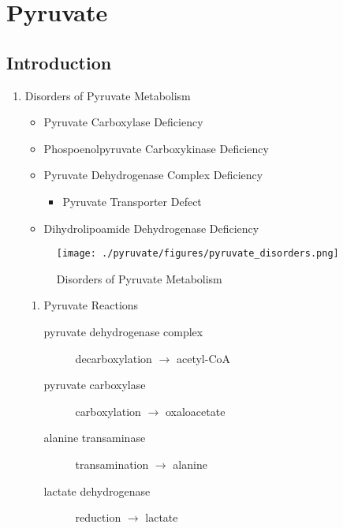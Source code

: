 \documentclass{scrartcl}
\begin{document}
\section{Pyruvate}
\label{sec:org5563591}
\subsection{Introduction}
\label{sec:orgb89a009}
\begin{enumerate}
\item Disorders of Pyruvate Metabolism
\label{sec:orgebe24ae}

\begin{itemize}
\item Pyruvate Carboxylase Deficiency
\item Phospoenolpyruvate Carboxykinase Deficiency
\item Pyruvate Dehydrogenase Complex Deficiency
\begin{itemize}
\item Pyruvate Transporter Defect
\end{itemize}
\item Dihydrolipoamide Dehydrogenase Deficiency
\end{itemize}


\begin{figure}[htbp]
\centering
\texttt{[image: ./pyruvate/figures/pyruvate\_disorders.png]}
\caption[TCA]{\label{fig:org30f584c}
Disorders of Pyruvate Metabolism}
\end{figure}

\begin{enumerate}
\item Pyruvate Reactions
\label{sec:org2fab598}

\begin{description}
\item[{pyruvate dehydrogenase complex}] decarboxylation \(\to\) acetyl-CoA
\end{description}


\begin{description}
\item[{pyruvate carboxylase}] carboxylation \(\to\) oxaloacetate
\end{description}


\begin{description}
\item[{alanine transaminase}] transamination \(\to\) alanine
\end{description}


\begin{description}
\item[{lactate dehydrogenase}] reduction \(\to\) lactate
\end{description}

\end{enumerate}
\end{enumerate}
\end{document}
